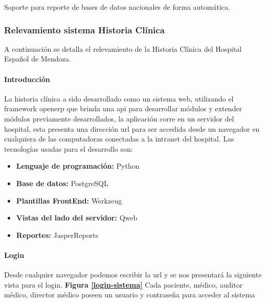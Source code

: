 Soporte para reporte de bases de datos nacionales de forma automática.

\subsubsection{Relevamiento sistema Historia Clínica}
A continuación se detalla el relevamiento de la Historia Clínica del Hospital Español de Mendoza.

{\correccionTexto
\paragraph{Introducción}

La historia clínica a sido desarrollado como un sistema web,  utilizando el framework openerp que brinda una api para desarrollar módulos y extender módulos previamente desarrollados, la aplicación corre en un servidor del hospital, esta presenta una dirección url para ser accedida desde un navegador en cualquiera de las computadoras conectadas a la intranet del hospital. Las tecnologías usadas para el desarrollo son:

\begin{itemize}
	\item\textbf{Lenguaje de programación:} Python
    \item\textbf{Base de datos:} PostgreSQL
    \item\textbf{Plantillas FrontEnd:} Werkzeug
    \item\textbf{Vistas del lado del servidor:} Qweb
    \item\textbf{Reportes:} JasperReports
\end{itemize}

\paragraph{Login}

Desde cualquier navegador podemos escribir la url y se nos presentará la siguiente vista para el login. \textbf{Figura \ref{login-sistema}}
Cada paciente, médico, auditor médico, director médico poseen un usuario y contraseña para acceder al sistema
}

